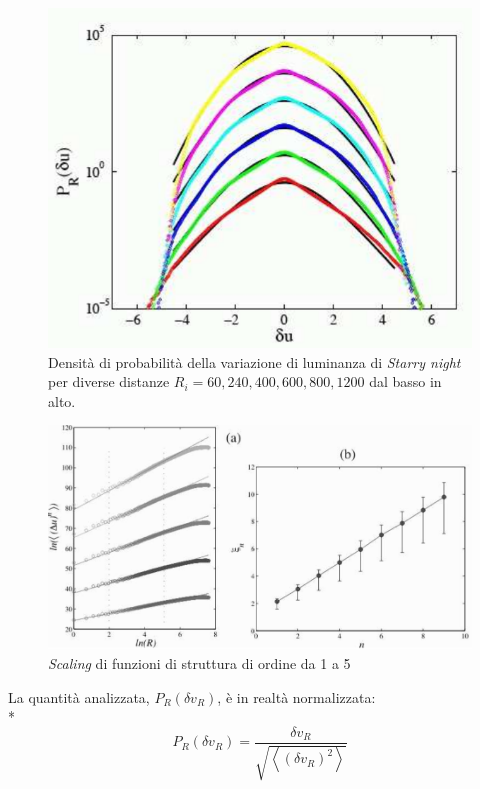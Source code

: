 \documentclass[12pt,a4paper]{article}
\numberwithin{equation}{section}
\begin{document}
\begin{figure}[h]
    \centering
    \includegraphics[scale=0.5]{gauss.png}
    \caption{Densità di probabilità della variazione di luminanza di \emph{Starry night} per diverse distanze $R_i = 60, 240, 400, 600, 800, 1200$ dal basso in alto.}
    \label{gaussians}
\end{figure}

\begin{figure}
    \centering
    \includegraphics[scale=0.3]{scalingpower.png}
    \caption{\emph{Scaling} di funzioni di struttura di ordine da 1 a 5}
    \label{scalingpower}
\end{figure}

La quantità analizzata, $P_R(\delta v_R)$, è in realtà normalizzata:\\*
\begin{equation}
P_R(\delta v_R)=
\frac{\delta v_R}{\sqrt{\left\langle
(\delta v_R )^2
\right\rangle}}
\end{equation}
\end{document}
